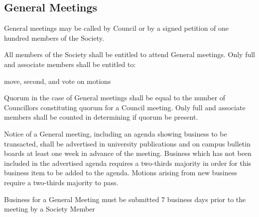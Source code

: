 \subsection{General Meetings}
\begin{longenum}[ label*=\thesubsection.\arabic*., align=left] 
	\item General meetings may be called by Council or by a signed petition of one hundred members of the Society.
    

    \item All members of the Society shall be entitled to attend General meetings. Only full and associate members  shall be entitled to:
    \begin{longenum}[ label*=\arabic*., align=left]
		\item move, second, and vote on motions
	\end{longenum}
    \item Quorum in the case of General meetings shall be equal to the number of Councillors constituting quorum for a Council meeting. Only full and associate members shall be counted in determining if quorum be present.
    \item Notice of a General meeting, including an agenda showing business to be transacted, shall be advertised in university publications and on campus bulletin boards at least one week in advance of the meeting. Business which has not been included in the advertised agenda requires a two-thirds majority in order for this business item to be added to the agenda. Motions arising from new business require a two-thirds majority to pass.
	\item  Business for a General Meeting must be submitted 7 business days prior to the meeting by a Society Member 

\end{longenum}
